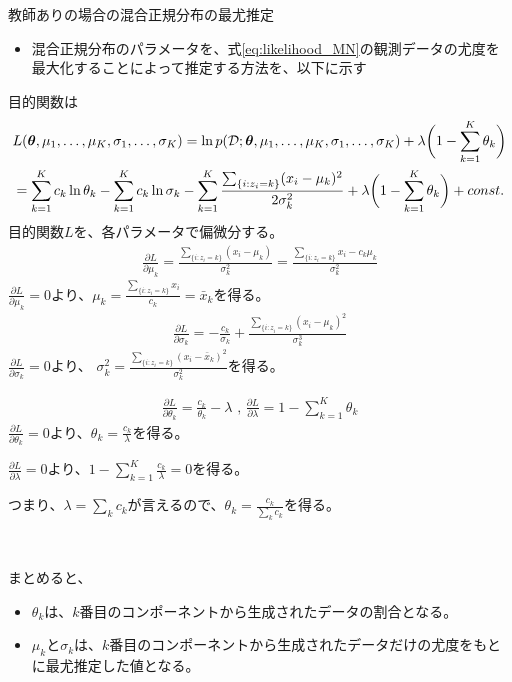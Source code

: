 \documentclass[aspectratio=169,unicode,dvipdfmx,14pt]{beamer}
\begin{document}
\begin{frame}{教師ありの場合の混合正規分布の最尤推定}
\begin{itemize}
\item 混合正規分布のパラメータを、式\eqref{eq:likelihood_MN}の観測データの尤度を最大化することによって推定する方法を、以下に示す
\end{itemize}
\end{frame}


\begin{frame}
\FontMath
\vspace{.1in}
目的関数は
\begin{align}
& L(\bm{\theta},\mu_1,\ldots,\mu_K,\sigma_1,\ldots,\sigma_K)
= \ln p(\mathcal{D};\bm{\theta},\mu_1,\ldots,\mu_K,\sigma_1,\ldots,\sigma_K) 
+ \lambda \bigg( 1 - \sum_{k=1}^K \theta_k \bigg)
\notag \\ &
= \sum_{k=1}^K c_k \ln \theta_k - \sum_{k=1}^K c_k \ln \sigma_k
- \sum_{k=1}^K \frac{\sum_{ \{ i : z_i = k \} } (x_i - \mu_k)^2}{ 2\sigma_k^2} + \lambda \bigg( 1 - \sum_{k=1}^K \theta_k \bigg) + const.
\end{align}
目的関数$L$を、各パラメータで偏微分する。
\begin{align}
\frac{\partial L}{\partial \mu_k} = \frac{ \sum_{ \{ i : z_i = k \} } (x_i - \mu_k) }{\sigma_k^2}
= \frac{ \sum_{ \{ i : z_i = k \} } x_i - c_k \mu_k }{\sigma_k^2}
\end{align}
$\frac{\partial L}{\partial \mu_k} = 0$より、$\mu_k = \frac{ \sum_{ \{ i : z_i = k \} } x_i }{ c_k } = \bar{x}_k$を得る。
\begin{align}
\frac{\partial L}{\partial \sigma_k} = - \frac{c_k}{\sigma_k} + \frac{\sum_{ \{ i : z_i = k \} } (x_i - \mu_k)^2}{ \sigma_k^3}
\end{align}
$\frac{\partial L}{\partial \sigma_k} = 0$より、
$\sigma_k^2 = \frac{\sum_{ \{ i : z_i = k \} } (x_i - \bar{x}_k)^2}{ \sigma_k^2}$を得る。
\end{frame}

\begin{frame}
\FontMath
\begin{align}
\frac{\partial L}{\partial \theta_k} = \frac{c_k}{\theta_k} - \lambda \mbox{ , \ }
\frac{\partial L}{\partial \lambda} = 1 - \sum_{k=1}^K \theta_k
\end{align}
$\frac{\partial L}{\partial \theta_k} = 0$より、$\theta_k = \frac{c_k}{\lambda}$を得る。

$\frac{\partial L}{\partial \lambda} = 0$より、$1 - \sum_{k=1}^K \frac{c_k}{\lambda} = 0$を得る。

つまり、$\lambda = \sum_k c_k$が言えるので、$\theta_k = \frac{c_k}{\sum_k c_k}$を得る。

\

まとめると、
\begin{itemize}
\item $\theta_k$は、$k$番目のコンポーネントから生成されたデータの割合となる。
\item $\mu_k$と$\sigma_k$は、$k$番目のコンポーネントから生成されたデータだけの尤度をもとに最尤推定した値となる。
\end{itemize}
\end{frame}
\end{document}
